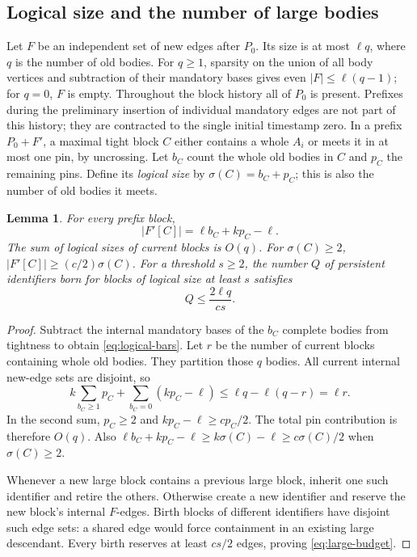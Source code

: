 \documentclass[11pt,a4paper]{article}
\newtheorem{lemma}[theorem]{Lemma}
\theoremstyle{definition}
\theoremstyle{remark}
\begin{document}
\subsection{Logical size and the number of large bodies}

Let $F$ be an independent set of new edges after $P_0$.
Its size is at most $\ell q$, where $q$ is the number
of old bodies. For $q\geq1$, sparsity on the union of all body
vertices and subtraction of their mandatory bases gives even
$|F|\leq\ell(q-1)$; for $q=0$, $F$ is empty.
Throughout the block history
all of $P_0$ is present. Prefixes during the preliminary insertion
of individual mandatory edges are not part of this history;
they are contracted to the single initial timestamp zero.
In a prefix $P_0+F'$, a maximal tight block
$C$ either contains a whole $A_i$ or meets it in at most
one pin, by uncrossing.
Let $b_C$ count the whole old bodies in $C$ and $p_C$
the remaining pins. Define its \emph{logical size} by
$\sigma(C)=b_C+p_C$; this is also the number of old
bodies it meets.

\begin{lemma}\label{lem:logical-size}
For every prefix block,
\begin{equation}\label{eq:logical-bars}
 |F'[C]|=\ell b_C+kp_C-\ell.
\end{equation}
The sum of logical sizes of current blocks is $O(q)$.
For $\sigma(C)\geq2$,
$|F'[C]|\geq(c/2)\sigma(C)$.
For a threshold $s\geq2$, the number $Q$ of persistent
identifiers born for blocks of logical size at least $s$
satisfies
\begin{equation}\label{eq:large-budget}
 Q\leq\frac{2\ell q}{cs}.
\end{equation}
\end{lemma}
\begin{proof}
Subtract the internal mandatory bases of the $b_C$
complete bodies from tightness to obtain
\eqref{eq:logical-bars}.
Let $r$ be the number of current blocks containing whole
old bodies. They partition those $q$ bodies. All current
internal new-edge sets are disjoint, so
\[
 k\sum_{b_C\geq1}p_C+
 \sum_{b_C=0}(kp_C-\ell)
 \leq \ell q-\ell(q-r)=\ell r.
\]
In the second sum, $p_C\geq2$ and
$kp_C-\ell\geq cp_C/2$.
The total pin contribution is therefore $O(q)$.
Also $\ell b_C+kp_C-\ell\geq k\sigma(C)-\ell
\geq c\sigma(C)/2$ when $\sigma(C)\geq2$.

Whenever a new large block contains a previous large
block, inherit one such identifier and retire the others.
Otherwise create a new identifier and reserve the new
block's internal $F$-edges. Birth blocks of different
identifiers have disjoint such edge sets: a shared edge
would force containment in an existing large descendant.
Every birth reserves at least $cs/2$ edges, proving
\eqref{eq:large-budget}.
\end{proof}
\end{document}
